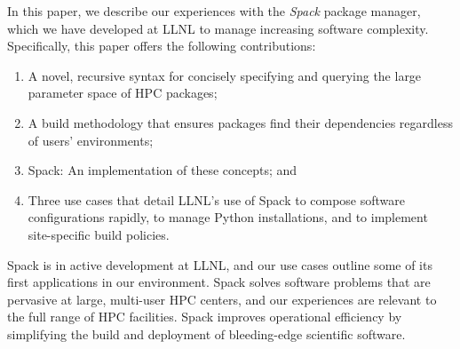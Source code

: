 In this paper, we describe our experiences with the {\it Spack} package manager,
which we have developed at LLNL to manage increasing software complexity.
Specifically, this paper offers the following contributions:
\begin{enumerate}
\item A novel, recursive syntax for concisely specifying and querying
      the large parameter space of HPC packages;
\item A build methodology that ensures packages find their dependencies
      regardless of users' environments;
\item Spack: An implementation of these concepts; and
\item Three use cases that detail LLNL's use of Spack to compose
      software configurations rapidly, to manage Python installations, and
      to implement site-specific build policies.
\end{enumerate}

\noindent Spack is in active development at LLNL, and our use cases outline some of
its first applications in our environment.  Spack solves software problems
that are pervasive at large, multi-user HPC centers, and our experiences
are relevant to the full range of HPC facilities.  Spack improves
operational efficiency by simplifying the build and deployment of
bleeding-edge scientific software.
